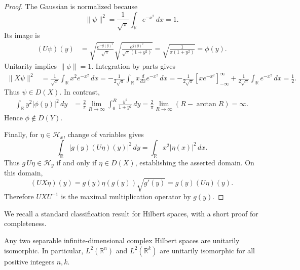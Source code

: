 \documentclass{techbrief}
\begin{document}
\begin{proof}
	The Gaussian is normalized because
	\begin{equation*}
		\|\psi\|^2
		=\frac{1}{\sqrt{\pi}}
		\int_{\mathbb{R}}e^{-x^2}\,dx=1.
	\end{equation*}
	Its image is
	\begin{equation*}
		\begin{aligned}
			(U\psi)(y)
			&=\sqrt{\frac{e^{-g(y)^2}}{\sqrt{\pi}}}
			\sqrt{\frac{e^{g(y)^2}}{\sqrt{\pi}(1+y^2)}}=\sqrt{\frac{1}{\pi(1+y^2)}}=\phi(y).
		\end{aligned}
	\end{equation*}
	Unitarity implies $\|\phi\|=1$. Integration by parts gives
	\begin{equation*}
		\begin{aligned}
			\|X\psi\|^2
			&=\frac{1}{\sqrt{\pi}}
			\int_{\mathbb{R}}x^2e^{-x^2}\,dx =-\frac{1}{2\sqrt{\pi}}
			\int_{\mathbb{R}}x\frac{d}{dx}e^{-x^2}\,dx=-\frac{1}{2\sqrt{\pi}}
			\left[xe^{-x^2}\right]_{-\infty}^{\infty}
			+\frac{1}{2\sqrt{\pi}}
			\int_{\mathbb{R}}e^{-x^2}\,dx =\frac{1}{2}.
		\end{aligned}
	\end{equation*}
	Thus $\psi\in D(X)$. In contrast,
	\begin{equation*}
		\begin{aligned}
			\int_{\mathbb{R}}y^2|\phi(y)|^2\,dy
			&=\frac{2}{\pi}\lim_{R\to\infty}
			\int_0^R\frac{y^2}{1+y^2}\,dy=\frac{2}{\pi}\lim_{R\to\infty}
			\left(R-\arctan R\right)
			=\infty.
		\end{aligned}
	\end{equation*}
	Hence $\phi\notin D(Y)$.
	
	Finally, for $\eta\in\mathcal{H}_x$, change of variables gives
	\begin{equation*}
		\int_{\mathbb{R}}|g(y)(U\eta)(y)|^2\,dy
		=\int_{\mathbb{R}}x^2|\eta(x)|^2\,dx.
	\end{equation*}
	Thus $g\,U\eta\in\mathcal{H}_y$ if and only if
	$\eta\in D(X)$, establishing the asserted domain.
	On this domain,
	\begin{equation*}
		(U X\eta)(y)
		=g(y)\eta(g(y))\sqrt{g'(y)}
		=g(y)(U\eta)(y).
	\end{equation*}
	Therefore $UXU^{-1}$ is the maximal multiplication
	operator by $g(y)$.
\end{proof}

We recall a standard classification result for Hilbert spaces,
with a short proof for completeness.

\begin{prop}\label{infiniteEquivalent}
	Any two separable infinite-dimensional complex Hilbert spaces
	are unitarily isomorphic. In particular,
	$L^2(\mathbb{R}^n)$ and $L^2(\mathbb{R}^k)$ are unitarily
	isomorphic for all positive integers $n,k$.
\end{prop}
\end{document}
